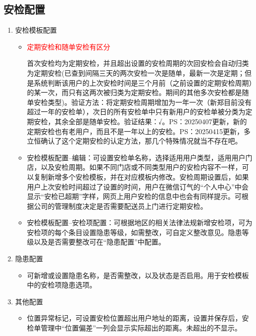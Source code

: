 \documentclass[UTF8]{ctexart}
\begin{document}
\subsection{安检配置}
\begin{enumerate}
	\item 安检模板配置
	
	\begin{itemize}
		

	\item \textcolor{red}{定期安检和随单安检有区分}
	
	首次安检均为定期安检，并且超出设置的安检周期的次回安检会自动归类为定期安检(已查到间隔三天的两次安检一次是随单，最新一次是定期；但是系统判断该用户的上次安检时间是三个月前（之前设置的定期安检周期）的某一次，而只有这两次被归类为定期安检。期间的其他多次安检都是随单安检类型)。验证方法：将定期安检周期增加为一年一次（新郑目前没有超过一年的安检单），次日的所有安检单中只有新用户的安检单被分类为定期安检，其余全部是随单安检。验证结果：√。PS：20250407更新，新的定期安检也有老用户，而且不是一年以上的安检。PS：20250415更新，多立恒确认了这个定期安检的认定方法，那几个特殊情况就当不存在吧。
	
	
	\item 安检模板配置--编辑：可设置安检单名称，选择适用用户类型，适用用户门店，以及安检周期。如果不同门店或不同类型用户的安检内容不一样，可以复制新增多个安检模板，并在对应模板内修改。安检周期设置后，如果用户上次安检时间超过了设置的时间，用户在微信订气的“个人中心”中会显示“安检已超期”字样，网页上用户安检的信息中也会有同样提示。可根据公司的管理制度决定是否需要配送员上门进行定期安检。
	
    \item 安检模板配置--安检项配置：可根据地区的相关法律法规新增安检项，可为安检项的每个条目设置隐患等级，如需整改，可自定义整改意见。隐患等级以及是否需要整改可在“隐患配置”中配置。
	
	\end{itemize}
	
	\item 隐患配置
	\begin{itemize}
		\item 
	
	可新增或设置隐患名称，是否需整改，以及状态是否启用。用于安检模板中的安检项隐患选项。
	\end{itemize}
	\item 其他配置
	
	\begin{itemize} 
	
	\item 位置异常标记，可设置安检位置超出用户地址的距离，设置并保存后，安检单管理中“位置偏差”一列会显示实际超出的距离。未超出的不显示。
	

\end{itemize}
\end{enumerate}
\end{document}
